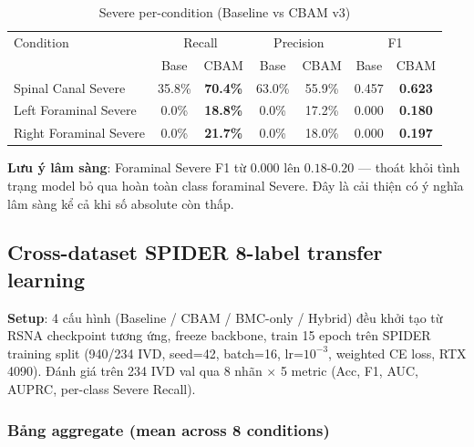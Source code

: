 \documentclass[11pt,a4paper]{article}
\newcommand{\best}[1]{\textcolor{best}{\textbf{#1}}}
\begin{document}
\begin{table}[h]
\centering
\caption{Severe per-condition (Baseline vs CBAM v3)}
\small
\begin{tabular}{@{}lcccccc@{}}
\toprule
\rowcolor{tablehdr}
Condition & \multicolumn{2}{c}{Recall} & \multicolumn{2}{c}{Precision} & \multicolumn{2}{c}{F1} \\
          & Base & CBAM & Base & CBAM & Base & CBAM \\
\midrule
Spinal Canal Severe   & 35.8\% & \best{70.4\%} & 63.0\% & 55.9\% & 0.457 & \best{0.623} \\
Left Foraminal Severe & 0.0\%  & \best{18.8\%} & 0.0\%  & 17.2\% & 0.000 & \best{0.180} \\
Right Foraminal Severe & 0.0\% & \best{21.7\%} & 0.0\%  & 18.0\% & 0.000 & \best{0.197} \\
\bottomrule
\end{tabular}
\end{table}

\noindent\textbf{Lưu ý lâm sàng}: Foraminal Severe F1 từ $0.000$ lên
$0.18$-$0.20$ --- thoát khỏi tình trạng model bỏ qua hoàn toàn class
foraminal Severe. Đây là cải thiện có ý nghĩa lâm sàng kể cả khi số
absolute còn thấp.

\subsection{Cross-dataset SPIDER 8-label transfer learning}

\noindent\textbf{Setup}: 4 cấu hình (Baseline / CBAM / BMC-only /
Hybrid) đều khởi tạo từ RSNA checkpoint tương ứng, freeze backbone,
train 15 epoch trên SPIDER training split (940/234 IVD, seed=42, batch=16,
lr=$10^{-3}$, weighted CE loss, RTX 4090). Đánh giá trên 234 IVD val
qua 8 nhãn $\times$ 5 metric (Acc, F1, AUC, AUPRC, per-class Severe Recall).

\subsubsection*{Bảng aggregate (mean across 8 conditions)}
\end{document}
